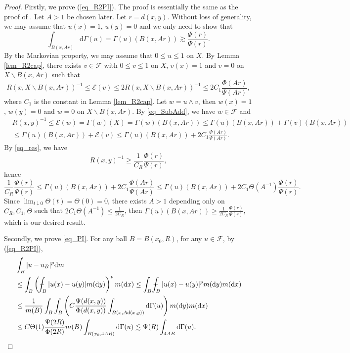 \documentclass[11pt,a4paper]{article}
\numberwithin{equation}{section}
\def\Xint#1{\mathchoice
{\XXint\displaystyle\textstyle{#1}}%
{\XXint\textstyle\scriptstyle{#1}}%
{\XXint\scriptstyle\scriptscriptstyle{#1}}%
{\XXint\scriptscriptstyle\scriptscriptstyle{#1}}%
\!\int}
\def\XXint#1#2#3{{\setbox0=\hbox{$#1{#2#3}{\int}$ }
\vcenter{\hbox{$#2#3$ }}\kern-.6\wd0}}
\def\dashint{\Xint-}
\theoremstyle{plain}
\theoremstyle{definition}
\begin{document}
\begin{proof}
Firstly, we prove (\ref{eq_R2PI}). The proof is essentially the same as the proof of \cite[LEMMA 2.5]{BCK05}. Let $A>1$ be chosen later. Let $r=d(x,y)$. Without loss of generality, we may assume that $u(x)=1$, $u(y)=0$ and we only need to show that
$$\int_{B(x,Ar)}\mathrm{d}\Gamma(u)=\Gamma(u)(B(x,Ar))\gtrsim \frac{\Phi(r)}{\Psi(r)}.$$
By the Markovian property, we may assume that $0\le u\le 1$ on $X$. By Lemma \ref{lem_R2cap}, there exists $v\in\mathcal{F}$ with $0\le v\le 1$ on $X$, $v(x)=1$ and $v=0$ on $X\backslash B(x,Ar)$ such that
$$R(x,X\backslash B(x,Ar))^{-1}\le\mathcal{E}(v)\le2 R(x,X\backslash B(x,Ar))^{-1}\le 2C_1 \frac{\Phi(Ar)}{\Psi(Ar)},$$
where $C_1$ is the constant in Lemma \ref{lem_R2cap}. Let $w=u\wedge v$, then $w(x)=1$, $w(y)=0$ and $w=0$ on $X\backslash B(x,Ar)$. By \ref{eq_SubAdd}, we have $w\in\mathcal{F}$ and
\begin{align*}
&R(x,y)^{-1}\le \mathcal{E}(w)=\Gamma(w)(X)=\Gamma(w)(B(x,Ar))\le\Gamma(u)(B(x,Ar))+\Gamma(v)(B(x,Ar))\\
&\le\Gamma(u)(B(x,Ar))+\mathcal{E}(v)\le\Gamma(u)(B(x,Ar))+2C_1 \frac{\Phi(Ar)}{\Psi(Ar)}.
\end{align*}
By \ref{eq_res}, we have
$$R(x,y)^{-1}\ge \frac{1}{C_R} \frac{\Phi(r)}{\Psi(r)},$$
hence
$$\frac{1}{C_R} \frac{\Phi(r)}{\Psi(r)}\le\Gamma(u)(B(x,Ar))+2C_1 \frac{\Phi(Ar)}{\Psi(Ar)}\le\Gamma(u)(B(x,Ar))+2C_1\Theta(A^{-1})\frac{\Phi(r)}{\Psi(r)}.$$
Since $\lim_{t\downarrow0}\Theta(t)=\Theta(0)=0$, there exists $A>1$ depending only on $C_R, C_1, \Theta$ such that $2C_1\Theta(A^{-1})\le \frac{1}{2C_R}$, then $\Gamma(u)(B(x,Ar))\ge \frac{1}{2C_R}\frac{\Phi(r)}{\Psi(r)}$, which is our desired result.

Secondly, we prove \ref{eq_PI}. For any ball $B=B(x_0,R)$, for any $u\in\mathcal{F}$, by (\ref{eq_R2PI}),
\begin{align*}
&\int_B|u-u_B|^p\mathrm{d} m\\
&\le\int_B \left(\dashint_B|u(x)-u(y)|m(\mathrm{d} y)\right)^pm(\mathrm{d} x)\le \int_B\dashint_B|u(x)-u(y)|^pm(\mathrm{d} y)m(\mathrm{d} x)\\
&\le\frac{1}{m(B)}\int_B\int_B \left(C \frac{\Psi(d(x,y))}{\Phi(d(x,y))}\int_{B(x,Ad(x,y))}\mathrm{d}\Gamma(u)\right)m(\mathrm{d} y)m (\mathrm{d} x)\\
&\le C\Theta(1)\frac{\Psi(2R)}{\Phi(2R)}m(B)\int_{B(x_0,4AR)}\mathrm{d}\Gamma(u)\lesssim\Psi(R)\int_{4AB}\mathrm{d}\Gamma(u).
\end{align*}
\end{proof}
\end{document}
